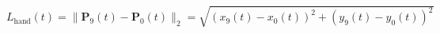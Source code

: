 \documentclass[border=1mm,preview]{standalone}
\begin{document}
$\displaystyle L_{\text{hand}}(t) = \|\mathbf{P}_9(t) - \mathbf{P}_0(t)\|_2 = \sqrt{(x_9(t) - x_0(t))^2 + (y_9(t) - y_0(t))^2}$
\end{document}
